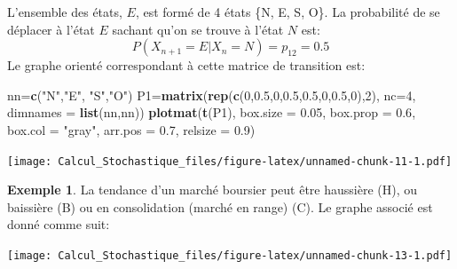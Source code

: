 \documentclass[
]{book}
\newenvironment{Shaded}{\begin{snugshade}}{\end{snugshade}}
\newcommand{\DataTypeTok}[1]{\textcolor[rgb]{0.13,0.29,0.53}{#1}}
\newcommand{\DecValTok}[1]{\textcolor[rgb]{0.00,0.00,0.81}{#1}}
\newcommand{\FloatTok}[1]{\textcolor[rgb]{0.00,0.00,0.81}{#1}}
\newcommand{\KeywordTok}[1]{\textcolor[rgb]{0.13,0.29,0.53}{\textbf{#1}}}
\newcommand{\NormalTok}[1]{#1}
\newcommand{\StringTok}[1]{\textcolor[rgb]{0.31,0.60,0.02}{#1}}
\theoremstyle{definition}
\theoremstyle{definition}
\newtheorem{example}{Exemple}[chapter]
\theoremstyle{definition}
\theoremstyle{remark}
\begin{document}
L'ensemble des états, \(E\), est formé de 4 états \{N, E, S, O\}. La probabilité de se déplacer à l'état \(E\) sachant qu'on se trouve à l'état \(N\) est:
\[
P(X_{n+1}=E|X_n=N)=p_{12}=0.5
\]
Le graphe orienté correspondant à cette matrice de transition est:

\begin{Shaded}
\begin{Highlighting}[]
\NormalTok{nn=}\KeywordTok{c}\NormalTok{(}\StringTok{"N"}\NormalTok{,}\StringTok{"E"}\NormalTok{, }\StringTok{"S"}\NormalTok{,}\StringTok{"O"}\NormalTok{)}
\NormalTok{P1=}\KeywordTok{matrix}\NormalTok{(}\KeywordTok{rep}\NormalTok{(}\KeywordTok{c}\NormalTok{(}\DecValTok{0}\NormalTok{,}\FloatTok{0.5}\NormalTok{,}\DecValTok{0}\NormalTok{,}\FloatTok{0.5}\NormalTok{,}\FloatTok{0.5}\NormalTok{,}\DecValTok{0}\NormalTok{,}\FloatTok{0.5}\NormalTok{,}\DecValTok{0}\NormalTok{),}\DecValTok{2}\NormalTok{), }\DataTypeTok{nc=}\DecValTok{4}\NormalTok{,}
          \DataTypeTok{dimnames =} \KeywordTok{list}\NormalTok{(nn,nn))}
\KeywordTok{plotmat}\NormalTok{(}\KeywordTok{t}\NormalTok{(P1), }\DataTypeTok{box.size =} \FloatTok{0.05}\NormalTok{, }\DataTypeTok{box.prop =} \FloatTok{0.6}\NormalTok{, }\DataTypeTok{box.col =} \StringTok{"gray"}\NormalTok{, }
          \DataTypeTok{arr.pos =} \FloatTok{0.7}\NormalTok{, }\DataTypeTok{relsize =} \FloatTok{0.9}\NormalTok{)}
\end{Highlighting}
\end{Shaded}

\texttt{[image: Calcul\_Stochastique\_files/figure-latex/unnamed-chunk-11-1.pdf]}
\begin{example}
\protect\hypertarget{exm:unnamed-chunk-12}{}{\label{exm:unnamed-chunk-12} }La tendance d'un marché boursier peut être haussière (H), ou baissière (B) ou en consolidation (marché en range) (C). Le graphe associé est donné comme suit:
\end{example}
\texttt{[image: Calcul\_Stochastique\_files/figure-latex/unnamed-chunk-13-1.pdf]}
\end{document}
